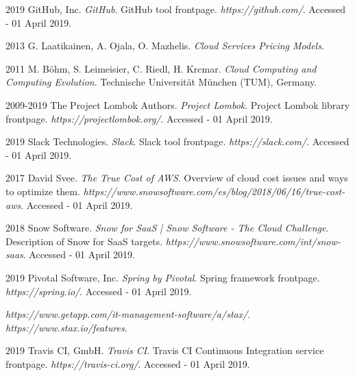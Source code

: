 \documentclass[licencjacka,en]{thesisclass}
\begin{document}
\begin{thebibliography}{99}
        2019 GitHub, Inc.
        \textit{GitHub}.
        GitHub tool frontpage.
        \textit{https://github.com/}.
        Accessed - 01 April 2019.

        2013 G. Laatikainen, A. Ojala, O. Mazhelis.
        \textit{Cloud Services Pricing Models}.

        2011 M. Böhm, S. Leimeisier, C. Riedl, H. Krcmar.
        \textit{Cloud Computing and Computing Evolution}.
        Technische Universität München (TUM), Germany.

        2009-2019 The Project Lombok Authors.
        \textit{Project Lombok}.
        Project Lombok library frontpage.
        \textit{https://projectlombok.org/}.
        Accessed - 01 April 2019.

        2019 Slack Technologies.
        \textit{Slack}.
        Slack tool frontpage.
        \textit{https://slack.com/}.
        Accessed - 01 April 2019.

        2017 David Svee.
        \textit{The True Cost of AWS}.
        Overview of cloud cost issues and ways to optimize them.
        \textit{https://www.snowsoftware.com/es/blog/2018/06/16/true-cost-aws}.
        Accessed - 01 April 2019.

        2018 Snow Software.
        \textit{Snow for SaaS | Snow Software - The Cloud Challenge}.
        Description of Snow for SaaS targets.
        \textit{https://www.snowsoftware.com/int/snow-saas}.
        Accessed - 01 April 2019.

        2019 Pivotal Software, Inc.
        \textit{Spring by Pivotal}.
        Spring framework frontpage.
        \textit{https://spring.io/}.
        Accessed - 01 April 2019.

        \textit{https://www.getapp.com/it-management-software/a/stax/}.
        \textit{https://www.stax.io/features}.

        2019 Travis CI, GmbH.
        \textit{Travis CI}.
        Travis CI Continuous Integration service frontpage.
        \textit{https://travis-ci.org/}.
        Accessed - 01 April 2019.

    \end{thebibliography}
\end{document}
